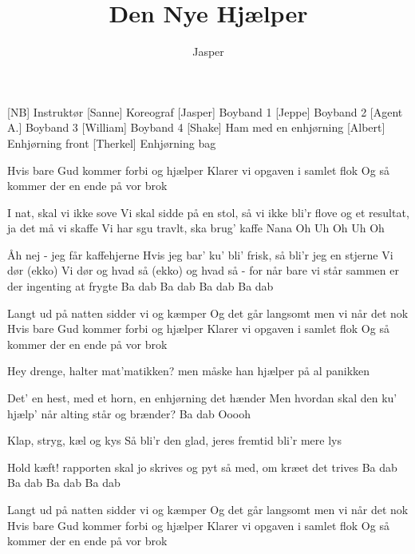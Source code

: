 \documentclass[a4paper,11pt]{article}
\title{Den Nye Hjælper}
\author{Jasper}
\begin{document}
\maketitle

\begin{roles}
[NB] Instruktør
[Sanne] Koreograf
[Jasper] Boyband 1
[Jeppe] Boyband 2
[Agent A.] Boyband 3
[William] Boyband 4
[Shake] Ham med en enhjørning
[Albert] Enhjørning front
[Therkel] Enhjørning bag
\end{roles}

\begin{song}
 Hvis bare Gud kommer forbi og hjælper
Klarer vi opgaven i samlet flok
Og så kommer der en ende på vor brok

 I nat, skal vi ikke sove
Vi skal sidde på en stol, så vi ikke bli'r flove
og et resultat, ja det må vi skaffe
Vi har sgu travlt,
ska brug' kaffe
Nana
Oh Uh Oh Uh Oh

 Åh nej -
jeg får kaffehjerne
Hvis jeg bar' ku' bli' frisk, så bli'r jeg en stjerne
Vi dør
 (ekko) Vi dør
 og hvad så
 (ekko) og hvad så
 - for når bare vi står sammen
er der ingenting at frygte
 Ba dab Ba dab Ba dab Ba dab

 Langt ud på natten sidder vi og kæmper
Og det går langsomt men vi når det nok
Hvis bare Gud kommer forbi og hjælper
Klarer vi opgaven i samlet flok
Og så kommer der en ende på vor brok


 Hey drenge, halter mat'matikken?
men måske han hjælper på al panikken

 Det' en hest,
 med et horn,
 en enhjørning det hænder
 Men hvordan skal den ku' hjælp' når alting står og brænder?
 Ba dab
 Ooooh

 Klap, stryg, kæl og kys
Så bli'r den glad, jeres fremtid bli'r mere lys

 Hold kæft! rapporten skal jo skrives
og pyt så med, om kræet det trives
Ba dab Ba dab Ba dab Ba dab

 Langt ud på natten sidder vi og kæmper
Og det går langsomt men vi når det nok
Hvis bare Gud kommer forbi og hjælper
Klarer vi opgaven i samlet flok
Og så kommer der en ende på vor brok


\end{song}
\end{document}
